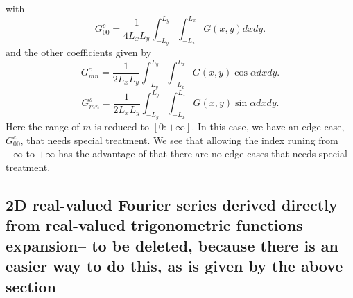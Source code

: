 \documentclass{article}
\begin{document}
with
\begin{equation}
  G^c_{00} = \frac{1}{4 L_x L_y} \int_{- L_y}^{L_y} \int_{- L_x}^{L_x} G (x,
  y) d x d y.
\end{equation}
and the other coefficients given by
\begin{equation}
  G^c_{m n} = \frac{1}{2 L_x L_y} \int_{- L_y}^{L_y} \int_{- L_x}^{L_x} G (x,
  y) \cos \alpha d x d y.
\end{equation}
\begin{equation}
  \label{23-10-17-3} G^s_{m n} = \frac{1}{2 L_x L_y} \int_{- L_y}^{L_y}
  \int_{- L_x}^{L_x} G (x, y) \sin \alpha d x d y.
\end{equation}
Here the range of $m$ is reduced to $[0 : + \infty]$. In this case, we have an
edge case, $G_{00}^c$, that needs special treatment. We see that allowing the
index runing from $-{\infty}$ to $+{\infty}$ has the advantage of that there are
no edge cases that needs special treatment.

\subsection{2D real-valued Fourier series derived directly from real-valued
trigonometric functions expansion-- to be deleted, because there is an easier
way to do this, as is given by the above section}\label{10-23-8}
\end{document}
